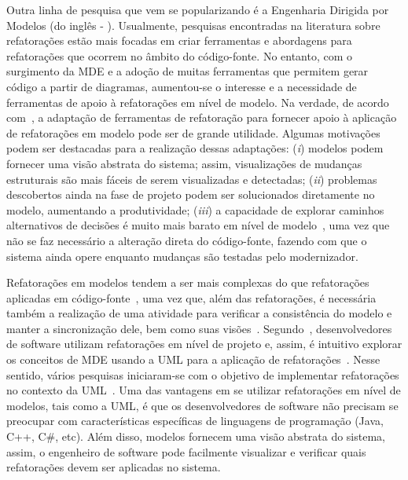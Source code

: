 Outra linha de pesquisa que vem se popularizando é a Engenharia Dirigida por Modelos (do inglês - ). 
Usualmente, pesquisas encontradas na literatura sobre refatorações estão mais focadas em criar ferramentas e abordagens para refatorações que ocorrem no âmbito do código-fonte. 
No entanto, com o surgimento da MDE e a adoção de muitas ferramentas que permitem gerar código a partir de diagramas, aumentou-se o interesse e a necessidade de ferramentas de apoio à refatorações em nível de modelo. Na verdade, de acordo com~, a adaptação de ferramentas de refatoração para fornecer apoio à aplicação de refatorações em modelo pode ser de grande utilidade. Algumas motivações podem ser destacadas para a realização dessas adaptações: (\emph{i}) modelos podem fornecer uma visão abstrata do sistema; assim, visualizações de mudanças estruturais são mais fáceis de serem visualizadas e detectadas; (\emph{ii}) problemas descobertos ainda na fase de projeto podem ser solucionados diretamente no modelo, aumentando a produtividade; (\emph{iii}) a capacidade de explorar caminhos alternativos de decisões é muito mais barato em nível de modelo~\cite{Mens_2006}, uma vez que não se faz necessário a alteração direta do código-fonte, fazendo com que o sistema ainda opere enquanto mudanças são testadas pelo modernizador.


Refatorações em modelos tendem a ser mais complexas do que refatorações aplicadas em código-fonte~\cite{Mens_2006}, uma vez que, além das refatorações, é necessária também a realização de uma atividade para verificar a consistência do modelo e manter a sincronização dele, bem como suas visões~\cite{KolahdouzRahimi20145}. Segundo~, desenvolvedores de software utilizam refatorações em nível de projeto e, assim, é intuitivo explorar os conceitos de MDE usando a UML para a aplicação de refatorações~\cite{Salem_2008, Gorp, Egyed_2008, Briand_2006, staron2004implementing}. Nesse sentido, vários pesquisas iniciaram-se com o objetivo de implementar refatorações no contexto da UML~\cite{revisao_sistematica_uml_refactoring}. Uma das vantagens em se utilizar refatorações em nível de modelos, tais como a UML, é que os desenvolvedores de software não precisam se preocupar com características específicas de linguagens de programação (Java, C++, C\#, etc). Além disso, modelos fornecem uma visão abstrata do sistema, assim, o engenheiro de software pode facilmente visualizar e verificar quais refatorações devem ser aplicadas no sistema. 

